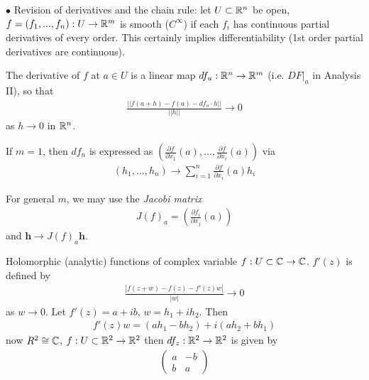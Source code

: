 \documentclass[a4paper]{article}
\begin{document}
$\bullet$ Revision of derivatives and the chain rule: let $U \subset \mathbb{R}^n$ be open, $f=(f_1,...,f_n): U \to \mathbb{R}^m$ is smooth ($C^\infty$) if each $f_i$ has continuous partial derivatives of every order. This certainly implies differentiability (1st order partial derivatives are continuous).

The derivative of $f$ at $a \in U$ is a linear map $df_u:\mathbb{R}^n \to \mathbb{R}^m$ (i.e. $DF|_a$ in Analysis II), so that
\begin{equation*}
\begin{aligned}
\frac{||f(a+h)-f(a)-df_a \cdot h||}{||h||} \to 0
\end{aligned}
\end{equation*}
as $h \to 0$ in $\mathbb{R}^n$.

If $m=1$, then $df_n$ is expressed as $\left(\frac{\partial f}{\partial x_1}(a),...,\frac{\partial f}{\partial x_i}(a)\right)$ via
\begin{equation*}
\begin{aligned}
(h_1,...,h_n) \to \sum_{i=1}^n \frac{\partial f}{\partial x_i}(a) h_i
\end{aligned}
\end{equation*}

For general $m$, we may use the \emph{Jacobi matrix}
\begin{equation*}
\begin{aligned}
J(f)_a = \left(\frac{\partial f_i}{\partial x_j}(a)\right)
\end{aligned}
\end{equation*}
and $\mathbf{h} \to J(f)_a \mathbf{h}$.

\begin{eg}
Holomorphic (analytic) functions of complex variable $f:U \subset \mathbb{C} \to \mathbb{C}$. $f'(z)$ is defined by
\begin{equation*}
\begin{aligned}
\frac{|f(z+w)-f(z)-f'(z)w|}{|w|} \to 0
\end{aligned}
\end{equation*}
as $w \to 0$. Let $f'(z) = a+ib$, $w=h_1+ih_2$. Then
\begin{equation*}
\begin{aligned}
f'(z)w = (ah_1-bh_2)+i(ah_2+bh_1)
\end{aligned}
\end{equation*}
now $R^2 \cong \mathbb{C}$, $f: U \subset \mathbb{R}^2 \to \mathbb{R}^2$ then $df_z: \mathbb{R}^2 \to \mathbb{R}^2$ is given by
\begin{equation*}
\begin{aligned}
\left(\begin{matrix}
a & -b\\
b & a
\end{matrix}\right)
\end{aligned}
\end{equation*}
\end{eg}
\end{document}

